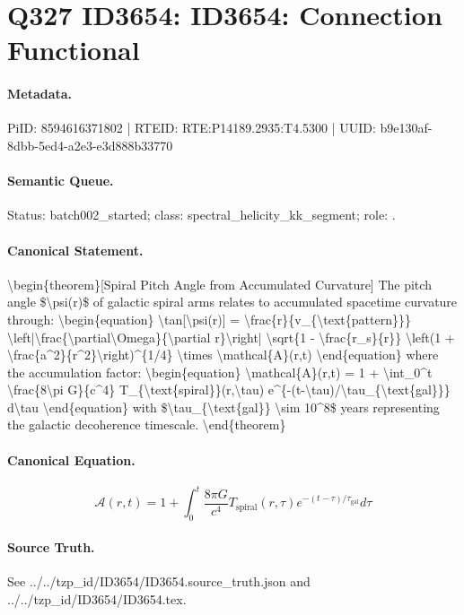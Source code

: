 \section*{Q327 ID3654: ID3654: Connection Functional}
\paragraph{Metadata.}
PiID: 8594616371802 | RTEID: RTE:P14189.2935:T4.5300 | UUID: b9e130af-8dbb-5ed4-a2e3-e3d888b33770

\paragraph{Semantic Queue.}
Status: batch002\_started; class: spectral\_helicity\_kk\_segment; role: .

\paragraph{Canonical Statement.}
\textbackslash{}begin\{theorem\}[Spiral Pitch Angle from Accumulated Curvature] The pitch angle \$\textbackslash{}psi(r)\$ of galactic spiral arms relates to accumulated spacetime curvature through: \textbackslash{}begin\{equation\} \textbackslash{}tan[\textbackslash{}psi(r)] = \textbackslash{}frac\{r\}\{v\_\{\textbackslash{}text\{pattern\}\}\} \textbackslash{}left|\textbackslash{}frac\{\textbackslash{}partial\textbackslash{}Omega\}\{\textbackslash{}partial r\}\textbackslash{}right| \textbackslash{}sqrt\{1 - \textbackslash{}frac\{r\_s\}\{r\}\} \textbackslash{}left(1 + \textbackslash{}frac\{a\textasciicircum{}2\}\{r\textasciicircum{}2\}\textbackslash{}right)\textasciicircum{}\{1/4\} \textbackslash{}times \textbackslash{}mathcal\{A\}(r,t) \textbackslash{}end\{equation\} where the accumulation factor: \textbackslash{}begin\{equation\} \textbackslash{}mathcal\{A\}(r,t) = 1 + \textbackslash{}int\_0\textasciicircum{}t \textbackslash{}frac\{8\textbackslash{}pi G\}\{c\textasciicircum{}4\} T\_\{\textbackslash{}text\{spiral\}\}(r,\textbackslash{}tau) e\textasciicircum{}\{-(t-\textbackslash{}tau)/\textbackslash{}tau\_\{\textbackslash{}text\{gal\}\}\} d\textbackslash{}tau \textbackslash{}end\{equation\} with \$\textbackslash{}tau\_\{\textbackslash{}text\{gal\}\} \textbackslash{}sim 10\textasciicircum{}8\$ years representing the galactic decoherence timescale. \textbackslash{}end\{theorem\}

\paragraph{Canonical Equation.}
\[
\begin{equation} \mathcal{A}(r,t) = 1 + \int_0^t \frac{8\pi G}{c^4} T_{\text{spiral}}(r,\tau) e^{-(t-\tau)/\tau_{\text{gal}}} d\tau \end{equation}
\]

\paragraph{Source Truth.}
See ../../tzp\_id/ID3654/ID3654.source\_truth.json and ../../tzp\_id/ID3654/ID3654.tex.

